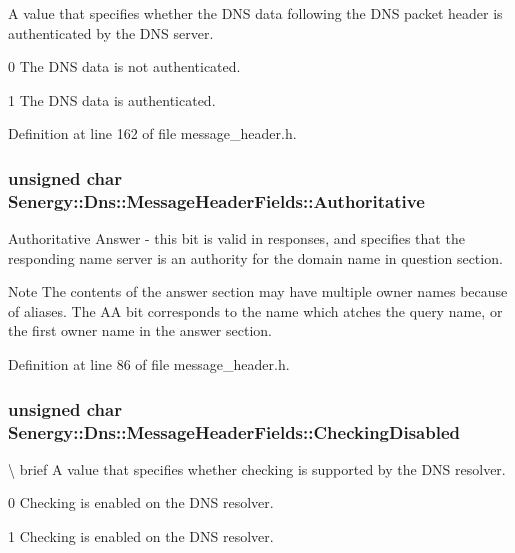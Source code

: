 A value that specifies whether the D\-N\-S data following the D\-N\-S packet header is authenticated by the D\-N\-S server. 

0 The D\-N\-S data is not authenticated.

1 The D\-N\-S data is authenticated. 

Definition at line 162 of file message\-\_\-header.\-h.

\hypertarget{struct_senergy_1_1_dns_1_1_message_header_fields_a706fe34b459a6aaacc28f0249213b013}{
\subsubsection[{Authoritative}]{\setlength{\rightskip}{0pt plus 5cm}unsigned char Senergy\-::\-Dns\-::\-Message\-Header\-Fields\-::\-Authoritative}}\label{struct_senergy_1_1_dns_1_1_message_header_fields_a706fe34b459a6aaacc28f0249213b013}


Authoritative Answer -\/ this bit is valid in responses, and specifies that the responding name server is an authority for the domain name in question section. 

\begin{DoxyNote}{Note}
The contents of the answer section may have multiple owner names because of aliases. The A\-A bit corresponds to the name which atches the query name, or the first owner name in the answer section. 
\end{DoxyNote}


Definition at line 86 of file message\-\_\-header.\-h.

\hypertarget{struct_senergy_1_1_dns_1_1_message_header_fields_a2c846064b4582f46a94bd90b32ef1cd9}{
\subsubsection[{Checking\-Disabled}]{\setlength{\rightskip}{0pt plus 5cm}unsigned char Senergy\-::\-Dns\-::\-Message\-Header\-Fields\-::\-Checking\-Disabled}}\label{struct_senergy_1_1_dns_1_1_message_header_fields_a2c846064b4582f46a94bd90b32ef1cd9}
\textbackslash{} brief A value that specifies whether checking is supported by the D\-N\-S resolver. \begin{DoxyVerb}      0               Checking is enabled on the DNS resolver.

      1               Checking is enabled on the DNS resolver.\end{DoxyVerb}
 

